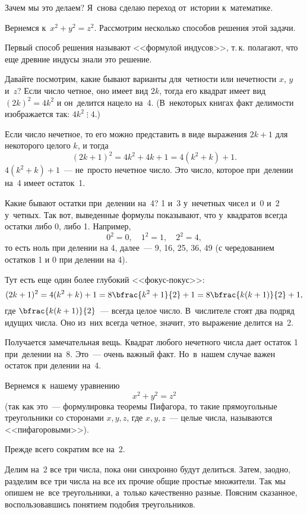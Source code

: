 Зачем мы это делаем? Я~снова сделаю переход от~истории к~математике.

Вернемся к~$x^{2}+y^{2}=z^{2}$. Рассмотрим несколько способов решения этой задачи.

Первый способ решения называют <<формулой индусов>>, т.\,к. полагают, что еще древние индусы знали
это решение.

Давайте посмотрим, какие бывают варианты для~четности или нечетности $x$, $y$ и~$z$? Если число четное,
оно имеет вид $2k$, тогда его квадрат имеет вид $(2k)^{2}=4k^{2}$ и он~делится нацело на~4. (В~некоторых
книгах факт делимости изображается так: $4k^{2}\mathbin{\vdots}4$.)

Если число нечетное, то его можно представить в виде выражения $2k+1$ для некоторого целого $k$, и тогда
$$
(2k+1)^{2}=4k^{2}+4k+1=4(k^{2}+k)+1.
$$
$4(k^{2}+k)+1$~--- не~просто нечетное число. Это число, которое при~делении на~4 имеет остаток~1.

Какие бывают остатки при~делении на~4? 1 и~3 у~нечетных чисел и~0 и~2 у~четных. Так вот, выведенные формулы показывают, что
у~квадратов всегда остатки либо 0, либо 1.
 Например,
$$
0^{2}=0,\quad
1^{2}=1,\quad
2^{2}=4,
$$
то есть ноль при делении на 4, далее~--- 9, 16, 25, 36, 49 (с чередованием остатков 1 и 0 при делении на 4).

Тут есть еще один более глубокий <<фокус-покус>>:
$$
(2k+1)^{2} =
4(k^{2}+k)+1=
8\bfrac{k^{2}+1}{2}+1=
8\bfrac{k(k+1)}{2}+1,
$$
где $\bfrac{k(k+1)}{2}$~--- всегда целое число. В~числителе стоят два подряд идущих числа. Оно из~них
всегда четное, значит, это выражение делится на~2.



Получается замечательная вещь. Квадрат любого нечетного числа дает остаток 1 при~делении на~8.
Это~--- очень важный факт. Но~в~нашем случае важен остаток при делении на~4.

Вернемся к~нашему уравнению
\begin{equation} %
\label{2-3-1}
x^{2}+y^{2}=z^{2}
\end{equation}
(так как это~--- формулировка теоремы Пифагора, то такие прямоугольные треугольники со сторонами
$x, y, z$, где $x, y, z$~--- целые числа, называются <<пифагоровыми>>).


Прежде всего сократим все на~2.

Делим на~2 все три числа, пока они синхронно будут делиться. Затем, заодно, разделим все три
числа на все их прочие общие простые множители. Так мы опишем не~все треугольники, а~только
качественно разные. Поясним сказанное, воспользовавшись понятием подобия треугольников.

